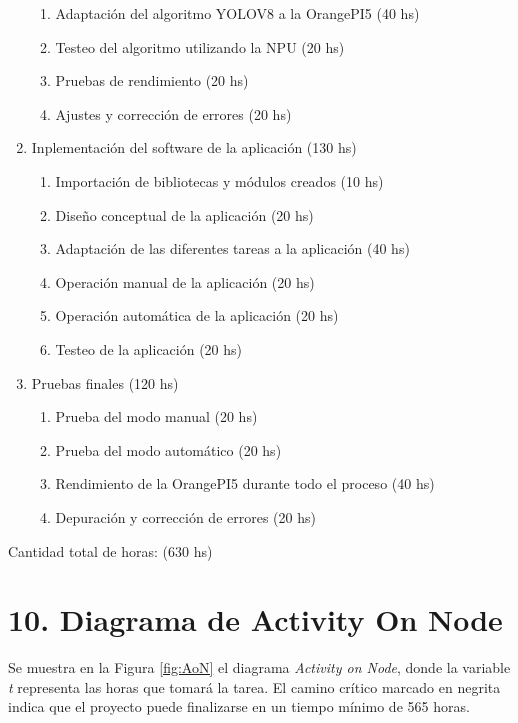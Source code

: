 \documentclass[
11pt, %
]{charter}
\begin{document}
\begin{enumerate}
	\begin{enumerate}
	\item Adaptación del algoritmo YOLOV8 a la OrangePI5 (40 hs)
	\item Testeo del algoritmo utilizando la NPU (20 hs)
	\item Pruebas de rendimiento  (20 hs)
	\item Ajustes y corrección de errores (20 hs)
	\end{enumerate}
\item Inplementación del software de la aplicación (130 hs)
	\begin{enumerate}
	\item Importación de bibliotecas y módulos creados (10 hs)
	\item Diseño conceptual de la aplicación (20 hs)
	\item Adaptación de las diferentes tareas a la aplicación  (40 hs)
	\item Operación manual de la aplicación (20 hs)
	\item Operación automática de la aplicación (20 hs)
	\item Testeo de la aplicación (20 hs)
	\end{enumerate}
\item Pruebas finales (120 hs)
	\begin{enumerate}
	\item Prueba del modo manual (20 hs)
	\item Prueba del modo automático (20 hs)
	\item Rendimiento de la OrangePI5 durante todo el proceso (40 hs)
	\item Depuración y corrección de errores (20 hs)
	\end{enumerate}
\end{enumerate}

Cantidad total de horas: (630 hs)





\section{10. Diagrama de Activity On Node}
\label{sec:AoN}

Se muestra en la Figura \ref{fig:AoN} el diagrama \textit{Activity on Node}, donde la variable \textit{t} representa las horas que tomará la tarea. El camino crítico marcado en negrita indica que el proyecto puede finalizarse en un tiempo mínimo de 565 horas.
\end{document}
